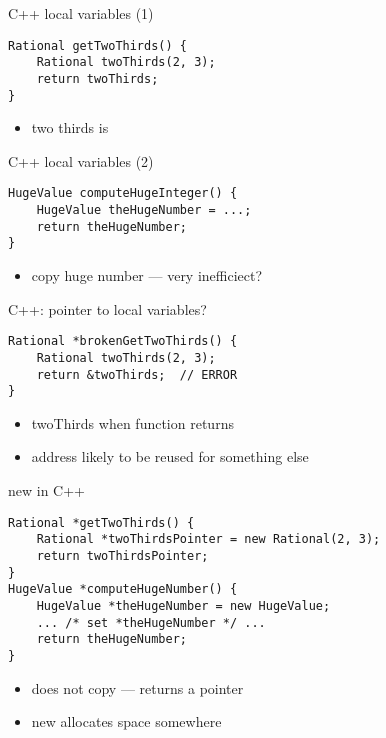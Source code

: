 \begin{frame}[fragile,label=noNewObjects]{C++ local variables (1)}
\lstset{language=C++,style=small}
\begin{lstlisting}
Rational getTwoThirds() {
    Rational twoThirds(2, 3);
    return twoThirds;
}
\end{lstlisting}
    \begin{itemize}
        \item two thirds is 
    \end{itemize}
\end{frame}

\begin{frame}[fragile,label=noNewObjects2]{C++ local variables (2)}
\lstset{language=C++,style=small}
\begin{lstlisting}
HugeValue computeHugeInteger() {
    HugeValue theHugeNumber = ...;
    return theHugeNumber;
}
\end{lstlisting}
    \begin{itemize}
        \item copy huge number --- very inefficiect?
    \end{itemize}
\end{frame}

\begin{frame}[fragile,label=pointerToLocal]{C++: pointer to local variables?}
\lstset{language=C++,style=small}
\begin{lstlisting}
Rational *brokenGetTwoThirds() {
    Rational twoThirds(2, 3);
    return &twoThirds;  // ERROR
}
\end{lstlisting}
\begin{itemize}
    \item twoThirds  when function returns
\item address likely to be reused for something else
\end{itemize}
\end{frame}

\begin{frame}[fragile,label=cppNewLocal]{new in C++}
\lstset{
    language=C++,
    style=smaller,
}
\begin{lstlisting}
Rational *getTwoThirds() {
    Rational *twoThirdsPointer = new Rational(2, 3);
    return twoThirdsPointer;
}
HugeValue *computeHugeNumber() {
    HugeValue *theHugeNumber = new HugeValue;
    ... /* set *theHugeNumber */ ...
    return theHugeNumber;
}
\end{lstlisting}
    \begin{itemize}
        \item does not copy --- returns a pointer
        \item new allocates space somewhere
    \end{itemize}
\end{frame}


